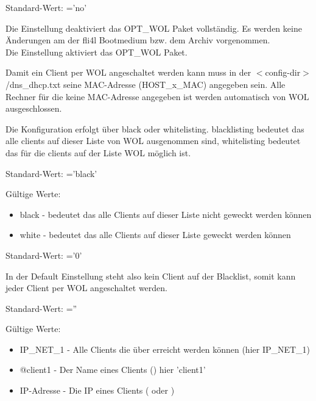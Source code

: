 \begin{description}


	Standard-Wert:  ='no'

	Die Einstellung  deaktiviert das OPT\_WOL Paket vollständig.
	Es werden keine Änderungen am der fli4l Bootmedium bzw. dem Archiv
	 vorgenommen.\\
	Die Einstellung  aktiviert das OPT\_WOL Paket.

	Damit ein Client per WOL angeschaltet werden kann muss in der
	$<$config-dir$>$/dns\_dhcp.txt seine
	MAC-Adresse (HOST\_x\_MAC) angegeben sein.
	Alle Rechner für die keine MAC-Adresse angegeben ist werden automatisch von
	WOL ausgeschlossen.


    Die Konfiguration erfolgt über black oder whitelisting.
    blacklisting bedeutet das alle clients auf dieser Liste von WOL ausgenommen
    sind, whitelisting bedeutet das für die clients auf der Liste WOL möglich ist.

	Standard-Wert:  ='black'

	Gültige Werte:
	\begin{itemize}
		\item black - bedeutet das alle Clients auf dieser Liste nicht geweckt werden können
		\item white - bedeutet das alle Clients auf dieser Liste geweckt werden können
	\end{itemize}


	Standard-Wert:  ='0'

	In der Default Einstellung steht also kein Client auf der Blacklist, somit kann
	jeder Client per WOL angeschaltet werden.


	Standard-Wert:  =''

	Gültige Werte:
	\begin{itemize}
		\item IP\_NET\_1	- Alle Clients die über  erreicht werden können (hier IP\_NET\_1)
		\item @client1		- Der Name eines Clients () hier 'client1'
		\item IP-Adresse	- Die IP eines Clients ( oder )
	\end{itemize}


\end{description}
